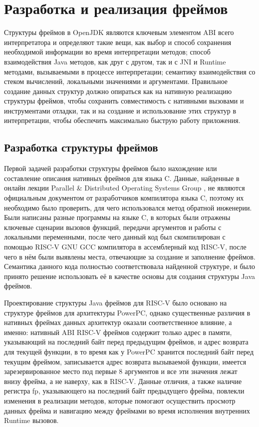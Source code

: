 \section{Разработка и реализация фреймов}

Структуры фреймов в OpenJDK являются ключевым элементом ABI всего интерпретатора и определяют такие вещи, как выбор и способ сохранения необходимой информации во время интерпретации методов; способ взаимодействия Java методов, как друг с другом, так и с JNI и Runtime методами, вызываемыми в процессе интерпретации; семантику взаимодействия со стеком вычислений, локальными значениями и аргументами. Правильное создание данных структур должно опираться как на нативную реализацию структуры фреймов, чтобы сохранить совместимость с нативными вызовами и инструментами отладки, так и на создание и использование этих структур в интерпретации, чтобы обеспечить максимально быструю работу приложения.



\subsection{Разработка структуры фреймов}

Первой задачей разработки структуры фреймов было нахождение или составление описания нативных фреймов для языка C. Данные, найденные в онлайн лекции Parallel \& Distributed Operating Systems Group \cite{lecture:frames}, не являются официальным документом от разработчиков компилятора языка C, поэтому их необходимо было проверить, для чего использовался метод обратной инженерии. Были написаны разные программы на языке C, в которых были отражены ключевые сценарии вызовов функций, передачи аргументов и работы с локальными переменными, после чего данный код был скомпилирован с помощью RISC-V GNU GCC \cite{riscv:gnu} компилятора в ассемблерный код RISC-V, после чего в нём были выявлены места, отвечающие за создание и заполнение фреймов. Семантика данного кода полностью соответствовала найденной структуре, и было принято решение использовать её в качестве основы для создания структуры Java фреймов. 

Проектирование структуры Java фреймов для RISC-V было основано на структуре фреймов для архитектуры PowerPC, однако существенные различия в нативных фреймах данных архитектур оказали соответственное влияние, а именно: нативный ABI RISC-V фреймов содержит только адрес в памяти, указывающий на последний байт перед предыдущим фреймов, и адрес возврата для текущей функции, в то время как у PowerPC хранится последний байт перед текущим фреймом, записывается адрес возврата вызываемой функции, имеется зарезервированное место под первые 8 аргументов и все эти значения лежат внизу фрейма, а не наверху, как в RISC-V.
Данные отличия, а также наличие регистра fp, указывающего на последний байт предыдущего фрейма, повлекли изменения в реализации методов, которые помогают осуществить просмотр данных фрейма и навигацию между фреймами во время исполнения внутренних Runtime вызовов.

